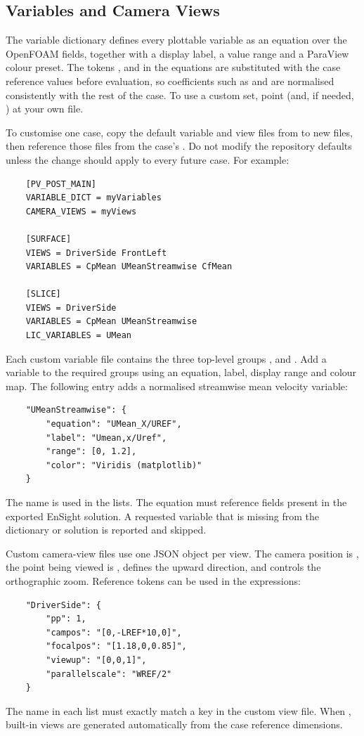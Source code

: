 \subsection{Variables and Camera Views}
The variable dictionary defines every plottable variable as an equation over the OpenFOAM fields, together with a display label, a value range and a ParaView colour preset. The tokens ,  and  in the equations are substituted with the case reference values before evaluation, so coefficients such as  and  are normalised consistently with the rest of the case. To use a custom set, point  (and, if needed, ) at your own file.

To customise one case, copy the default variable and view files from  to new files, then reference those files from the case's . Do not modify the repository defaults unless the change should apply to every future case. For example:
\begin{lstlisting}
    [PV_POST_MAIN]
    VARIABLE_DICT = myVariables
    CAMERA_VIEWS = myViews

    [SURFACE]
    VIEWS = DriverSide FrontLeft
    VARIABLES = CpMean UMeanStreamwise CfMean

    [SLICE]
    VIEWS = DriverSide
    VARIABLES = CpMean UMeanStreamwise
    LIC_VARIABLES = UMean
\end{lstlisting}

Each custom variable file contains the three top-level groups ,  and . Add a variable to the required groups using an equation, label, display range and colour map. The following entry adds a normalised streamwise mean velocity variable:
\begin{lstlisting}
    "UMeanStreamwise": {
        "equation": "UMean_X/UREF",
        "label": "Umean,x/Uref",
        "range": [0, 1.2],
        "color": "Viridis (matplotlib)"
    }
\end{lstlisting}
The name  is used in the  lists. The equation must reference fields present in the exported EnSight solution. A requested variable that is missing from the dictionary or solution is reported and skipped.

Custom camera-view files use one JSON object per view. The camera position is , the point being viewed is ,  defines the upward direction, and  controls the orthographic zoom. Reference tokens can be used in the expressions:
\begin{lstlisting}
    "DriverSide": {
        "pp": 1,
        "campos": "[0,-LREF*10,0]",
        "focalpos": "[1.18,0,0.85]",
        "viewup": "[0,0,1]",
        "parallelscale": "WREF/2"
    }
\end{lstlisting}
The name in each  list must exactly match a key in the custom view file. When , built-in views are generated automatically from the case reference dimensions.

